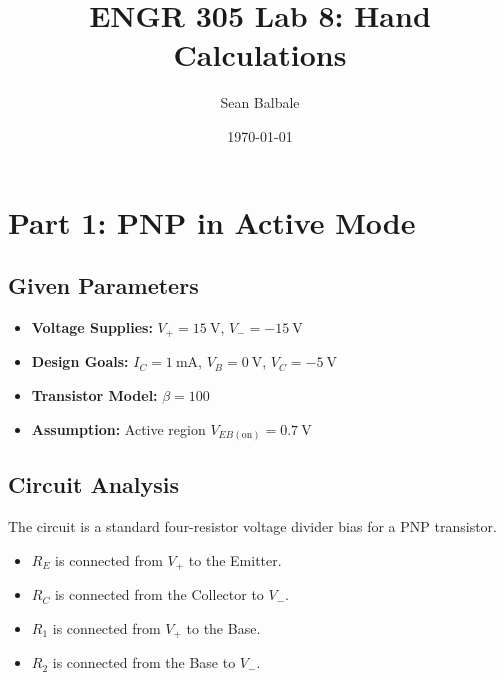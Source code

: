\documentclass[11pt]{article}
\title{ENGR 305 Lab 8: Hand Calculations}
\author{Sean Balbale} %
\date{\today} %
\begin{document}
\maketitle


\section{Part 1: PNP in Active Mode}

\subsection{Given Parameters}
\begin{itemize}
    \item \textbf{Voltage Supplies:} $V_{+} = \SI{15}{\volt}$, $V_{-} = \SI{-15}{\volt}$
    \item \textbf{Design Goals:} $I_{C} = \SI{1}{\milli\ampere}$, $V_{B} = \SI{0}{\volt}$, $V_{C} = \SI{-5}{\volt}$
    \item \textbf{Transistor Model:} $\beta = 100$
    \item \textbf{Assumption:} Active region $V_{EB(\text{on})} = \SI{0.7}{\volt}$
\end{itemize}

\subsection{Circuit Analysis}
The circuit is a standard four-resistor voltage divider bias for a PNP transistor.
\begin{itemize}
    \item $R_E$ is connected from $V_+$ to the Emitter.
    \item $R_C$ is connected from the Collector to $V_-$.
    \item $R_1$ is connected from $V_+$ to the Base.
    \item $R_2$ is connected from the Base to $V_-$.
\end{itemize}
\end{document}
